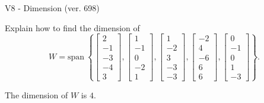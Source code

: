 \begin{exercise}
  \begin{exerciseTitle}V8 - Dimension (ver. 698)\end{exerciseTitle}
  \begin{exerciseStatement}
    Explain how to find the dimension of 
\[W=\mathrm{span}\ \left\{\left[\begin{array}{r}
2 \\
-1 \\
-3 \\
-4 \\
3
\end{array}\right] , \left[\begin{array}{r}
1 \\
-1 \\
0 \\
-2 \\
1
\end{array}\right] , \left[\begin{array}{r}
1 \\
-2 \\
3 \\
-3 \\
-3
\end{array}\right] , \left[\begin{array}{r}
-2 \\
4 \\
-6 \\
6 \\
6
\end{array}\right] , \left[\begin{array}{r}
0 \\
-1 \\
0 \\
1 \\
-3
\end{array}\right]\right\}.\]



  \end{exerciseStatement}
  \begin{exerciseAnswer}
   The dimension of \(W\) is  \(4\).
  


  \end{exerciseAnswer}
\end{exercise}